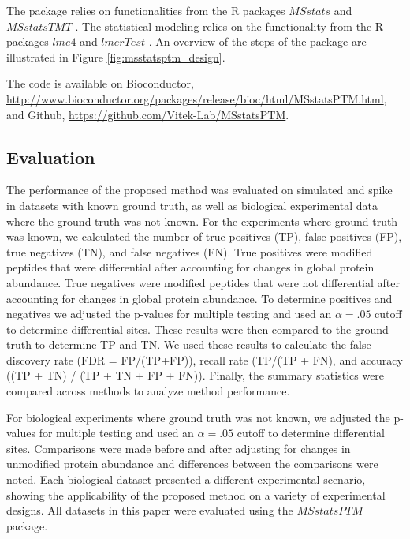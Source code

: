 \documentclass[mcp]{article}
\numberwithin{table}{section}
\begin{document}
The package relies on functionalities from the R packages $MSstats$ \cite{Choi:2014} and $MSstatsTMT$ \cite{Huang:2020}. The statistical modeling relies on the functionality from the R packages $lme4$ \cite{Bates2015} and $lmerTest$ \cite{Kuznetsova2017}. An overview of the steps of the package are illustrated in Figure \ref{fig:msstatsptm_design}.

The code is available on Bioconductor, \url{http://www.bioconductor.org/packages/release/bioc/html/MSstatsPTM.html}, and Github, \url{https://github.com/Vitek-Lab/MSstatsPTM}.

\subsection*{Evaluation}

The performance of the proposed method was evaluated on simulated and spike in datasets with known ground truth, as well as biological experimental data where the ground truth was not known. For the experiments where ground truth was known, we calculated the number of true positives (TP), false positives (FP), true negatives (TN), and false negatives (FN). True positives were modified peptides that were differential after accounting for changes in global protein abundance. True negatives were modified peptides that were not differential after accounting for changes in global protein abundance. To determine positives and negatives we adjusted the p-values for multiple testing and used an $\alpha=.05$ cutoff to determine differential sites. These results were then compared to the ground truth to determine TP and TN. We used these results to calculate the false discovery rate (FDR = FP/(TP+FP)), recall rate (TP/(TP + FN), and accuracy ((TP + TN) / (TP + TN + FP + FN)). Finally, the summary statistics were compared across methods to analyze method performance. 

For biological experiments where ground truth was not known, we adjusted the p-values for multiple testing and used an $\alpha=.05$ cutoff to determine differential sites. Comparisons were made before and after adjusting for changes in unmodified protein abundance and differences between the comparisons were noted. Each biological dataset presented a different experimental scenario, showing the applicability of the proposed method on a variety of experimental designs. All datasets in this paper were evaluated using the $MSstatsPTM$ package.
\end{document}
